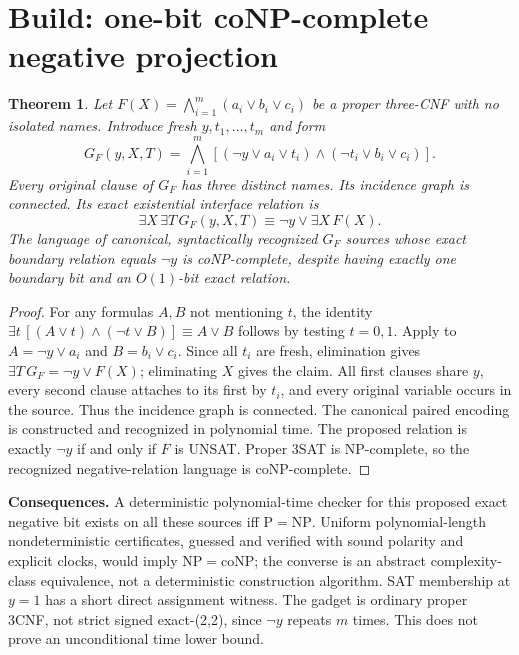 \documentclass[11pt]{article}
\newtheorem{theorem}{Theorem}
\begin{document}
\section{Build: one-bit coNP-complete negative projection}
\begin{theorem}
Let $F(X)=\bigwedge_{i=1}^m(a_i\vee b_i\vee c_i)$ be a proper three-CNF with no isolated names. Introduce fresh $y,t_1,\dots,t_m$ and form
\[
G_F(y,X,T)=\bigwedge_{i=1}^m
[(\neg y\vee a_i\vee t_i)\wedge
(\neg t_i\vee b_i\vee c_i)].
\]
Every original clause of $G_F$ has three distinct names. Its incidence graph is connected. Its exact existential interface relation is
\[
\exists X\,\exists T\,G_F(y,X,T)\equiv
\neg y\vee\exists X\,F(X).
\]
The language of canonical, syntactically recognized $G_F$ sources whose exact boundary relation equals $\neg y$ is coNP-complete, despite having exactly one boundary bit and an $O(1)$-bit exact relation.
\end{theorem}
\begin{proof}
For any formulas $A,B$ not mentioning $t$, the identity
$\exists t\,[(A\vee t)\wedge(\neg t\vee B)]\equiv A\vee B$
follows by testing $t=0,1$. Apply to $A=\neg y\vee a_i$ and $B=b_i\vee c_i$. Since all $t_i$ are fresh, elimination gives
$\exists T\,G_F=\neg y\vee F(X)$; eliminating $X$ gives the claim. All first clauses share $y$, every second clause attaches to its first by $t_i$, and every original variable occurs in the source. Thus the incidence graph is connected. The canonical paired encoding is constructed and recognized in polynomial time. The proposed relation is exactly $\neg y$ if and only if $F$ is UNSAT. Proper 3SAT is NP-complete, so the recognized negative-relation language is coNP-complete.
\end{proof}

\noindent\textbf{Consequences.} A deterministic polynomial-time checker for this proposed exact negative bit exists on all these sources iff $\mathrm P=\mathrm{NP}$. Uniform polynomial-length nondeterministic certificates, guessed and verified with sound polarity and explicit clocks, would imply $\mathrm{NP}=\mathrm{coNP}$; the converse is an abstract complexity-class equivalence, not a deterministic construction algorithm. SAT membership at $y=1$ has a short direct assignment witness. The gadget is ordinary proper 3CNF, not strict signed exact-(2,2), since $\neg y$ repeats $m$ times. This does not prove an unconditional time lower bound.
\end{document}
